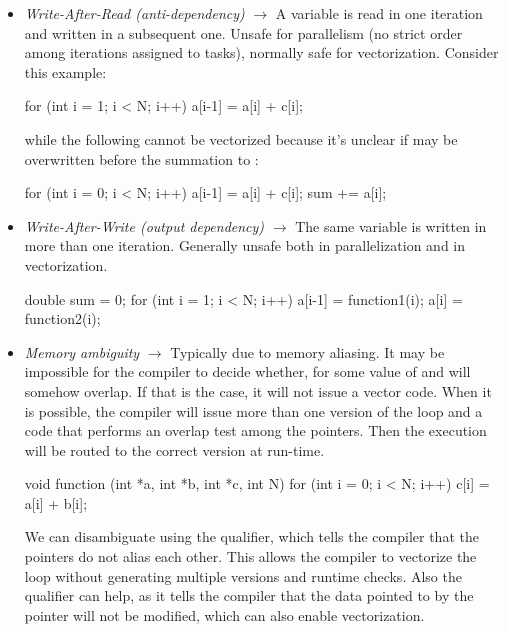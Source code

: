 \begin{itemize}
    Consider the dependency graph of the iteration space. It clearly shows that there are no vertical dependencies. Hence, the outer loop can be vectorized: 4 (or 8) outer iterations can be executed together because there are no vertical dependencies. However, if the elements are stored in memory in row-major order that require a lot of memory gather and scatter operations. If not supported in hw, they must be emulated, which is even more expensive. Thus, we may consider to write the data column-major if possible. 

    \item \textit{Write-After-Read (anti-dependency)} $\to$ A variable is read in one iteration and written in a subsequent one. Unsafe for parallelism (no strict order among iterations assigned to tasks), normally safe for vectorization. Consider this example:
    \begin{codeblock}[language=C]
for (int i = 1; i < N; i++) {
    a[i-1] = a[i] + c[i];
}
    \end{codeblock}
    while the following cannot be vectorized because it's unclear if  may be overwritten before the summation to :
    \begin{codeblock}[language=C]
for (int i = 0; i < N; i++) {
    a[i-1] = a[i] + c[i];
    sum += a[i];
}
    \end{codeblock}

    \item \textit{Write-After-Write (output dependency)} $\to$ The same variable is written in more than one iteration. Generally unsafe both in parallelization and in vectorization.
    \begin{codeblock}[language=C]
double sum = 0;
for (int i = 1; i < N; i++) {
    a[i-1] = function1(i);
    a[i] = function2(i);
}
    \end{codeblock}
    \item \textit{Memory ambiguity} $\to$ Typically due to memory aliasing. It may be impossible for the compiler to decide whether, for some value of  and  will somehow overlap. If that is the case, it will not issue a vector code. When it is possible, the compiler will issue more than one version of the loop and a code that performs an overlap test among the pointers. Then the execution will be routed to the correct version at run-time. 
    \begin{codeblock}[language=C]
void function (int *a, int *b, int *c, int N) {
    for (int i = 0; i < N; i++) {
        c[i] = a[i] + b[i];
    }
}
    \end{codeblock}
    We can disambiguate using the  qualifier, which tells the compiler that the pointers do not alias each other. This allows the compiler to vectorize the loop without generating multiple versions and runtime checks. Also the  qualifier can help, as it tells the compiler that the data pointed to by the pointer will not be modified, which can also enable vectorization.

\end{itemize}

